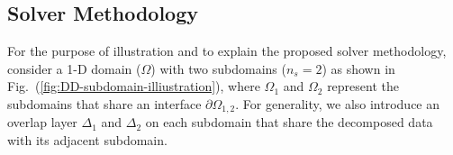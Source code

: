 \documentclass[conference]{IEEEtran}
\newcommand{\fig}[1]{Fig.~(\ref{#1})}
\begin{document}
\subsection{Solver Methodology}
\label{sec:solver-methodology}

For the purpose of illustration and to explain the proposed solver methodology, consider a 1-D domain ($\Omega$) with two subdomains ($n_s=2$) as shown in \fig{fig:DD-subdomain-illiustration}, where $\Omega_1$ and $\Omega_2$ represent the subdomains that share an interface $\partial \Omega_{1,2}$. For generality, we also introduce an overlap layer $\Delta_1$ and $\Delta_2$ on each subdomain that share the decomposed data with its adjacent subdomain. 

\end{document}
